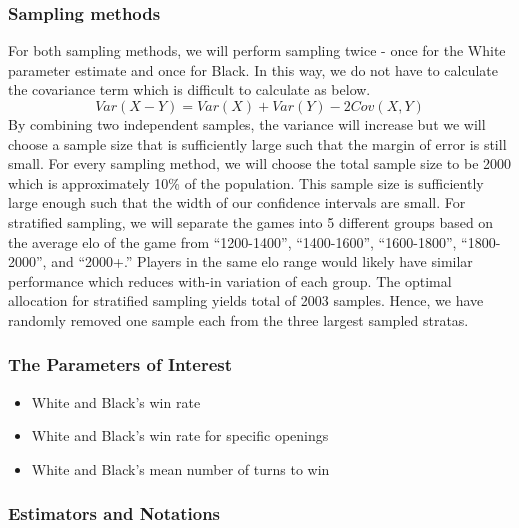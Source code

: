 \documentclass[11pt,]{article}
\begin{document}
\pagebreak

\hypertarget{sampling-methods}{%
\subsubsection{\texorpdfstring{\textbf{Sampling
methods}}{Sampling methods}}\label{sampling-methods}}

For both sampling methods, we will perform sampling twice - once for the
White parameter estimate and once for Black. In this way, we do not have
to calculate the covariance term which is difficult to calculate as
below. \[Var(X-Y) = Var(X)+Var(Y)-2Cov(X,Y)\] By combining two
independent samples, the variance will increase but we will choose a
sample size that is sufficiently large such that the margin of error is
still small. For every sampling method, we will choose the total sample
size to be 2000 which is approximately 10\% of the population. This
sample size is sufficiently large enough such that the width of our
confidence intervals are small. \newline For stratified sampling, we
will separate the games into 5 different groups based on the average elo
of the game from ``1200-1400'', ``1400-1600'', ``1600-1800'',
``1800-2000'', and ``2000+.'' Players in the same elo range would likely
have similar performance which reduces with-in variation of each group.
The optimal allocation for stratified sampling yields total of 2003
samples. Hence, we have randomly removed one sample each from the three
largest sampled stratas.

\hypertarget{the-parameters-of-interest}{%
\subsubsection{\texorpdfstring{\textbf{The Parameters of
Interest}}{The Parameters of Interest}}\label{the-parameters-of-interest}}

\begin{itemize}
\item White and Black's win rate
\item White and Black's win rate for specific openings
\item White and Black's mean number of turns to win
\end{itemize}

\hypertarget{estimators-and-notations}{%
\subsubsection{\texorpdfstring{\textbf{Estimators and
Notations}}{Estimators and Notations}}\label{estimators-and-notations}}
\end{document}
